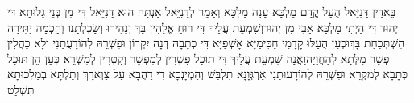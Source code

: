 \documentclass[../main/main.tex]{subfiles}
\begin{document}
\begin{multicols*}{\ncols}
בֵּאדַיִן דָּנִיֵּאל הֻעַל קֳדָם מַלְכָּא עָנֵה מַלְכָּא וְאָמַר לְדָנִיֵּאל אַנְתָּה הוּא דָנִיֵּאל דִּי מִן בְּנֵי גָלוּתָא דִּי יְהוּד דִּי הַיְתִי מַלְכָּא אַבִי מִן יְהוּד\PreVerseSpace{}וְשִׁמְעֵת עֲלַיִךְ דִּי רוּחַ אֱלָהִין בָּךְ וְנַהִירוּ וְשָׂכְלְתָנוּ וְחָכְמָה יַתִּירָה הִשְׁתְּכַחַת בָּךְ\PreVerseSpace{}וּכְעַן הֻעַלּוּ קָדָמַי חַכִּימַיָּא אָשְׁפַיָּא דִּי כְתָבָה דְנָה יִקְרוֹן וּפִשְׁרֵהּ לְהוֹדָעֻתַנִי וְלָא כָהֲלִין פְּשַׁר מִלְּתָא לְהַחֲוָיָה\PreVerseSpace{}וַאֲנָה שִׁמְעֵת עֲלַיִךְ דִּי תוּכַל פִּשְׁרִין לְמִפְשַׁר וְקִטְרִין לְמִשְׁרֵא כְּעַן הֵן תּוּכַל כְּתָבָא לְמִקְרֵא וּפִשְׁרֵהּ לְהוֹדָעוּתַנִי אַרְגְּוָנָא תִלְבַּשׁ וְהַמְיָנְכָא\SubEnd{} דִי דַהֲבָא עַל צַוְּארָךְ וְתַלְתָּא בְמַלְכוּתָא תִּשְׁלַט\OpenSection{}\par

\end{multicols*}
\end{document}
